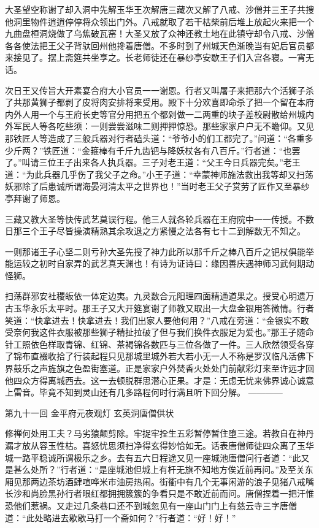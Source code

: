 \documentclass[12pt,UTF8]{ctexbook}
\begin{document}
{	大圣望空称谢了却入洞中先解玉华王次解唐三藏次又解了八戒、沙僧并三王子共搜他洞里物件逍逍停停将众领出门外。八戒就取了若干枯柴前后堆上放起火来把一个九曲盘桓洞烧做了乌焦破瓦窑！大圣又放了众神还教土地在此镇守却令八戒、沙僧各各使法把王父子背驮回州他搀着唐僧。不多时到了州城天色渐晚当有妃后官员都来接见了。摆上斋筵共坐享之。长老师徒还在暴纱亭安歇王子们入宫各寝。一宵无话。
	
	次日王又传旨大开素宴合府大小官员一一谢恩。行者又叫屠子来把那六个活狮子杀了共那黄狮子都剥了皮将肉安排将来受用。殿下十分欢喜即命杀了把一个留在本府内外人用一个与王府长史等官分用把五个都剁做一二两重的块子差校尉散给州城内外军民人等各吃些须：一则尝尝滋味二则押押惊恐。那些家家户户无不瞻仰。又见那铁匠人等造成了三般兵器对行者磕头道：“爷爷小的们工都完了。”问道：“各重多少斤两？”铁匠道：“金箍棒有千斤九齿钯与降妖杖各有八百斤。”行者道：“也罢了。”叫请三位王子出来各人执兵器。三子对老王道：“父王今日兵器完矣。”老王道：“为此兵器几乎伤了我父子之命。”小王子道：“幸蒙神师施法救出我等却又扫荡妖邪除了后患诚所谓海晏河清太平之世界也！”当时老王父子赏劳了匠作又至暴纱亭拜谢了师恩。
	
	三藏又教大圣等快传武艺莫误行程。他三人就各轮兵器在王府院中一一传授。不数日那三个王子尽皆操演精熟其余攻退之方紧慢之法各有七十二到解数无不知之。
	
	一则那诸王子心坚二则亏孙大圣先授了神力此所以那千斤之棒八百斤之钯杖俱能举能运较之初时自家弄的武艺真天渊也！有诗为证诗曰：缘因善庆遇神师习武何期动怪狮。
	
	扫荡群邪安社稷皈依一体定边夷。九灵数合元阳理四面精通道果之。授受心明遗万古玉华永乐太平时。那王子又大开筵宴谢了师教又取出一大盘金银用答微情。行者笑道：“快拿进去！快拿进去！我们出家人要他何用？”八戒在旁道：“金银实不敢受奈何我这件衣服被那些狮子精扯拉破了但与我们换件衣服足为爱也。”那王子随命针工照依色样取青锦、红锦、茶褐锦各数匹与三位各做了一件。三人欣然领受各穿了锦布直裰收拾了行装起程只见那城里城外若大若小无一人不称是罗汉临凡活佛下界鼓乐之声旌旗之色盈街塞道。正是家家户外焚香火处处门前献彩灯来至许远才回他四众方得离城西去。这一去顿脱群思潜心正果。才是：无虑无忧来佛界诚心诚意上雷音。毕竟不知到灵山还有几多路程何时行满且听下回分解。
	------------
	
	第九十一回 金平府元夜观灯 玄英洞唐僧供状
	
	修禅何处用工夫？马劣猿颠剪除。牢捉牢拴生五彩暂停暂住堕三途。若教自在神丹漏才放从容玉性枯。喜怒忧思须扫净得玄得妙恰如无。话表唐僧师徒四众离了玉华城一路平稳诚所谓极乐之乡。去有五六日程途又见一座城池唐僧问行者道：“此又是甚么处所？”行者道：“是座城池但城上有杆无旗不知地方俟近前再问。”及至关东厢见那两边茶坊酒肆喧哗米市油房热闹。街衢中有几个无事闲游的浪子见猪八戒嘴长沙和尚脸黑孙行者眼红都拥拥簇簇的争看只是不敢近前而问。唐僧捏着一把汗惟恐他们惹祸。又走过几条巷口还不到城忽见有一座山门门上有慈云寺三字唐僧道：“此处略进去歇歇马打一个斋如何？”行者道：“好！好！”
	
}
\end{document}
